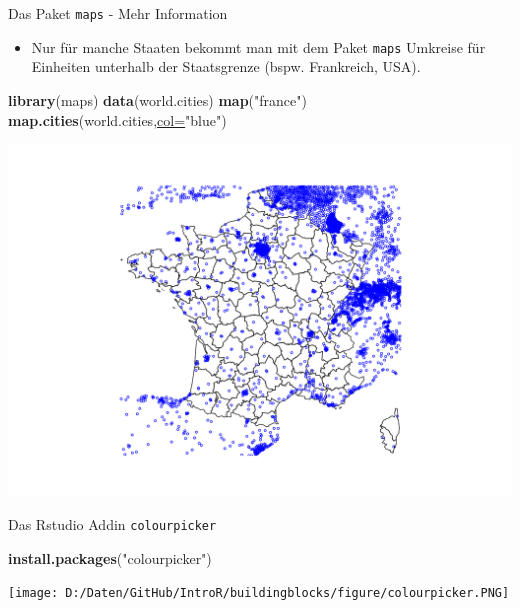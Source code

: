 \documentclass[ignorenonframetext,]{beamer}
\newenvironment{Shaded}{\begin{snugshade}}{\end{snugshade}}
\newcommand{\KeywordTok}[1]{\textcolor[rgb]{0.26,0.66,0.93}{\textbf{#1}}}
\newcommand{\DataTypeTok}[1]{\textcolor[rgb]{0.74,0.68,0.62}{\underline{#1}}}
\newcommand{\StringTok}[1]{\textcolor[rgb]{0.02,0.61,0.04}{#1}}
\newcommand{\NormalTok}[1]{\textcolor[rgb]{0.74,0.68,0.62}{#1}}
\providecommand{\tightlist}{%
  \setlength{\itemsep}{0pt}\setlength{\parskip}{0pt}}
\begin{document}
\begin{frame}[fragile]{Das Paket \texttt{maps} - Mehr Information}

\begin{itemize}
\tightlist
\item
  Nur für manche Staaten bekommt man mit dem Paket \texttt{maps}
  Umkreise für Einheiten unterhalb der Staatsgrenze (bspw. Frankreich,
  USA).
\end{itemize}

\begin{Shaded}
\begin{Highlighting}[]
\KeywordTok{library}\NormalTok{(maps)}
\KeywordTok{data}\NormalTok{(world.cities)}
\KeywordTok{map}\NormalTok{(}\StringTok{"france"}\NormalTok{)}
\KeywordTok{map.cities}\NormalTok{(world.cities,}\DataTypeTok{col=}\StringTok{"blue"}\NormalTok{)}
\end{Highlighting}
\end{Shaded}

\includegraphics{Geomedizin_files/figure-beamer/unnamed-chunk-163-1.pdf}

\end{frame}

\begin{frame}[fragile]{Das Rstudio Addin \texttt{colourpicker}}

\begin{Shaded}
\begin{Highlighting}[]
\KeywordTok{install.packages}\NormalTok{(}\StringTok{"colourpicker"}\NormalTok{)}
\end{Highlighting}
\end{Shaded}

\texttt{[image: D:/Daten/GitHub/IntroR/buildingblocks/figure/colourpicker.PNG]}

\end{frame}
\end{document}

